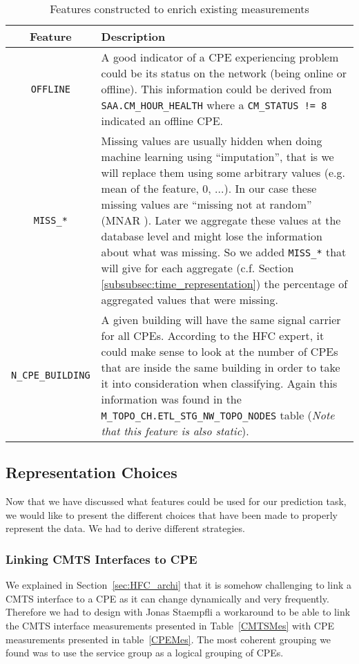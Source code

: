 \begin{table}[h]
\begin{center}
\begin{tabular}{c p{100mm}}
\hline
\textbf{Feature} & \textbf{Description}\\ 
\hline\hline
\texttt{OFFLINE} & A good indicator of a CPE experiencing problem could be its status on the network (being online or offline). This information could be derived from \texttt{SAA.CM\_HOUR\_HEALTH} where a \texttt{CM\_STATUS != 8} indicated an offline CPE.\\
\hline
\texttt{MISS\_*} & Missing values are usually hidden when doing machine learning using “imputation”, that is we will replace them using some arbitrary values (e.g. mean of the feature, 0, ...). In our case these missing values are “missing not at random” (MNAR \cite{wiki:mnar}). Later we aggregate these values at the database level and might lose the information about what was missing. So we added \texttt{MISS\_*} that will give for each aggregate (c.f. Section \ref{subsubsec:time_representation}) the percentage of aggregated values that were missing.\\
\hline
\texttt{N\_CPE\_BUILDING} & A given building will have the same signal carrier for all CPEs. According to the HFC expert, it could make sense to look at the number of CPEs that are inside the same building in order to take it into consideration when classifying. Again this information was found in the \texttt{M\_TOPO\_CH.ETL\_STG\_NW\_TOPO\_NODES} table (\textit{Note that this feature is also static}).\\
\end{tabular}
\end{center}
\caption{\label{CreatedMes}Features constructed to enrich existing measurements}
\end{table}


\subsection{Representation Choices}
Now that we have discussed what features could be used for our prediction task, we would like to present the different choices that have been made to properly represent the data. We had to derive different strategies. 

\subsubsection{Linking CMTS Interfaces to CPE}
We explained in Section~\ref{sec:HFC_archi} that it is somehow challenging to link a CMTS interface to a CPE as it can change dynamically and very frequently. Therefore we had to design with Jonas Staempfli a workaround to be able to link the CMTS interface measurements presented in Table~\ref{CMTSMes} with CPE measurements presented in table~\ref{CPEMes}. The most coherent grouping we found was to use the service group as a logical grouping of CPEs. 

